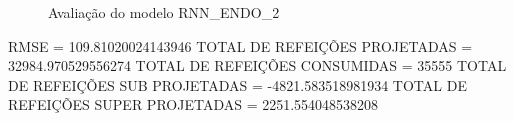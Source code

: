 \documentclass[	12pt, Times, openright, twoside, a4paper, english, brazil]{abntex2}
\begin{document}
                \begin{figure}[!ht]
                  \caption{Avaliação do modelo RNN\_ENDO\_2 \label{fig:case1_rnn_endo2_val} }
                \end{figure}
                RMSE = 109.81020024143946\newline
                TOTAL DE REFEIÇÕES PROJETADAS = 32984.970529556274\newline
                TOTAL DE REFEIÇÕES CONSUMIDAS = 35555\newline
                TOTAL DE REFEIÇÕES SUB PROJETADAS = -4821.583518981934\newline
                TOTAL DE REFEIÇÕES SUPER PROJETADAS = 2251.554048538208\newline
\end{document}
